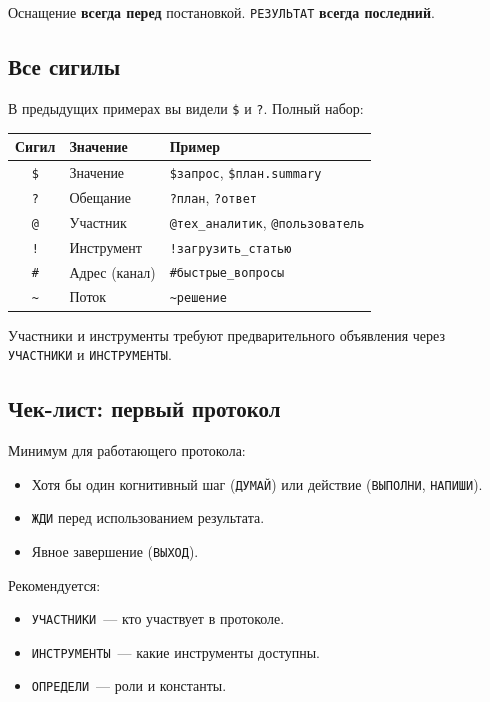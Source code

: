 \documentclass[11pt,a4paper]{article}
\newcommand{\ic}[1]{\texttt{\small #1}}
\begin{document}
Оснащение \textbf{всегда перед} постановкой. \ic{РЕЗУЛЬТАТ} \textbf{всегда последний}.

\subsection{Все сигилы}

В предыдущих примерах вы видели \ic{\$} и \ic{?}. Полный набор:

\begin{center}
\begin{tabular}{@{} c l l @{}}
\toprule
Сигил & Значение & Пример \\
\midrule
\ic{\$}  & Значение          & \ic{\$запрос}, \ic{\$план.summary} \\
\ic{?}  & Обещание          & \ic{?план}, \ic{?ответ} \\
\ic{@}  & Участник          & \ic{@тех\_аналитик}, \ic{@пользователь} \\
\ic{!}  & Инструмент        & \ic{!загрузить\_статью} \\
\ic{\#} & Адрес (канал)     & \ic{\#быстрые\_вопросы} \\
\ic{\~{}} & Поток            & \ic{\~{}решение} \\
\bottomrule
\end{tabular}
\end{center}

Участники и инструменты требуют предварительного объявления через \ic{УЧАСТНИКИ} и \ic{ИНСТРУМЕНТЫ}.

\subsection{Чек-лист: первый протокол}

Минимум для работающего протокола:

\begin{itemize}[leftmargin=2em]
\item Хотя бы один когнитивный шаг (\ic{ДУМАЙ}) или действие (\ic{ВЫПОЛНИ}, \ic{НАПИШИ}).
\item \ic{ЖДИ} перед использованием результата.
\item Явное завершение (\ic{ВЫХОД}).
\end{itemize}

Рекомендуется:

\begin{itemize}[leftmargin=2em]
\item \ic{УЧАСТНИКИ}~--- кто участвует в протоколе.
\item \ic{ИНСТРУМЕНТЫ}~--- какие инструменты доступны.
\item \ic{ОПРЕДЕЛИ}~--- роли и константы.
\end{itemize}
\end{document}

